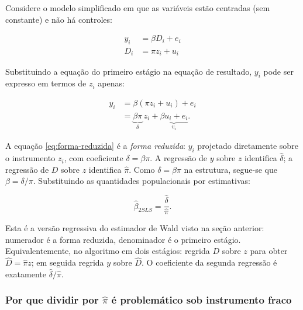 \documentclass[
]{article}
\begin{document}
Considere o modelo simplificado em que as variáveis estão centradas (sem constante) e não há controles:

\begin{equation}
\begin{aligned}
y_i &= \beta D_i + e_i \\
D_i &= \pi z_i + u_i
\end{aligned}
\label{eq:modelo-simples}
\end{equation}

Substituindo a equação do primeiro estágio na equação de resultado, \(y_i\) pode ser expresso em termos de \(z_i\) apenas:

\begin{equation}
\begin{aligned}
y_i &= \beta (\pi z_i + u_i) + e_i \\
    &= \underbrace{\beta \pi}_{\delta}\, z_i + \underbrace{\beta u_i + e_i}_{v_i}.
\end{aligned}
\label{eq:forma-reduzida}
\end{equation}

A equação \eqref{eq:forma-reduzida} é a \emph{forma reduzida}: \(y_i\) projetado diretamente sobre o instrumento \(z_i\), com coeficiente \(\delta = \beta \pi\). A regressão de \(y\) sobre \(z\) identifica \(\hat\delta\); a regressão de \(D\) sobre \(z\) identifica \(\hat\pi\). Como \(\delta = \beta \pi\) na estrutura, segue-se que \(\beta = \delta / \pi\). Substituindo as quantidades populacionais por estimativas:

\begin{equation}
\hat\beta_{2SLS} = \frac{\hat\delta}{\hat\pi}.
\label{eq:beta-2sls}
\end{equation}

Esta é a versão regressiva do estimador de Wald visto na seção anterior: numerador é a forma reduzida, denominador é o primeiro estágio. Equivalentemente, no algoritmo em dois estágios: regrida \(D\) sobre \(z\) para obter \(\hat D = \hat\pi z\); em seguida regrida \(y\) sobre \(\hat D\). O coeficiente da segunda regressão é exatamente \(\hat\delta / \hat\pi\).

\subsubsection{\texorpdfstring{Por que dividir por \(\hat\pi\) é problemático sob instrumento fraco}{Por que dividir por \textbackslash hat\textbackslash pi é problemático sob instrumento fraco}}\label{por-que-dividir-por-hatpi-uxe9-problemuxe1tico-sob-instrumento-fraco}
\end{document}
